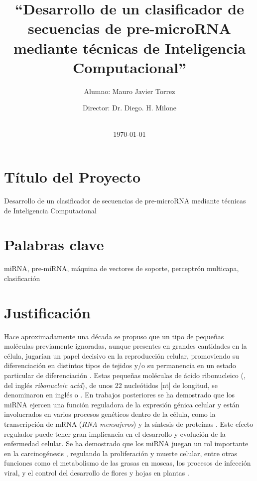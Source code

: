 \documentclass[12pt,bibliography=oldstyle,DIV=12,parskip=full-,titlepage]{scrartcl}
\begin{document}
%
\titlehead{\center\large Universidad Nacional del Litoral\\
  Facultad de Ingeniería y Ciencias Hídricas}
%
\subject{Propuesta de Proyecto Final de Carrera\\Ingeniería en
  Informática}
%
\title{\LARGE ``Desarrollo de un clasificador de secuencias de pre-microRNA
  mediante técnicas de Inteligencia Computacional''}
%
%
\author{{Alumno: Mauro Javier Torrez}\and{Director: Dr. Diego. H. Milone}}
%
\date{\-\\[2em]\today}
\renewcommand*{\titlepagestyle}{empty}
\maketitle
\setcounter{page}{1}
%
%
\section{Título del Proyecto}
Desarrollo de un clasificador de
secuencias de pre-microRNA mediante
técnicas de Inteligencia Computacional
%
%
\section{Palabras clave}
miRNA, pre-miRNA, máquina de vectores
de soporte, perceptrón multicapa, clasificación
%
%
\section{Justificación}
%
%
Hace aproximadamente una década se propuso que un tipo de pequeñas
moléculas previamente ignoradas, aunque presentes en grandes
cantidades en la célula, jugarían un papel decisivo en la reproducción
celular, promoviendo su diferenciación en distintos tipos de tejidos
y/o su permanencia en un estado particular de diferenciación
\cite{lee-mammal}.  Estas pequeñas moléculas de ácido ribonucleico
(, del inglés \emph{ribonucleic acid}), de unos 22
nucleótidos [nt] de longitud, se denominaron en inglés  o
.  En trabajos posteriores se ha demostrado que los miRNA
ejercen una función reguladora de la expresión génica celular
\cite{bartel116} y están involucrados en varios procesos genéticos
dentro de la célula, como la transcripción de mRNA (\emph{RNA
  mensajeros}) y la síntesis de proteínas \cite{lili}.  Este efecto
regulador puede tener gran implicancia en el desarrollo y evolución de
la enfermedad celular. Se ha demostrado que los miRNA juegan un rol
importante en la carcinogénesis \cite{aurora}\cite{lili}, regulando la
proliferación y muerte celular, entre otras funciones como el
metabolismo de las grasas en moscas, los procesos de infección viral,
y el control del desarrollo de flores y hojas en plantas
\cite{bartel116}\cite{lecellier}.
\end{document}
